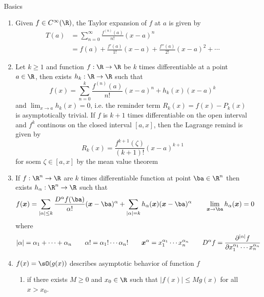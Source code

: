 \documentclass[11pt]{article}
\begin{document}
\tableofcontents

\newpage
\begin{center}
    Basics
\end{center}

\begin{enumerate}
    \item {} Given $f \in C^{\infty}(\R)$, the Taylor expansion of $f$ at $a$ is given by 
    \begin{align*}
        T(a)
        &= \sum_{n=0}^{\infty} \frac{f^{(n)}(a)}{n!} (x-a)^n \\
        &= f(a) + \frac{f'(a)}{1!}(x-a) + \frac{f''(a)}{2!} (x-a)^2 + \cdots
    \end{align*}
    \item {} Let $k\geq 1$ and function $f:\R\to\R$ be $k$ times differentiable at a point $a\in \R$, then exists $h_k:\R\to\R$ such that 
    \[
        f(x)
        = \sum_{n=0}^{k} \frac{f^{(n)}(a)}{n!} (x-a)^n + h_k(x) (x-a)^k
    \]
    and $\lim_{x\to a} h_k(x) = 0$, i.e. the reminder term $R_k(x) = f(x) - P_k(x)$ is asymptotically trivial. If $f$ is $k+1$ times differentiable on the open interval and $f^k$ continous on the closed interval $[a,x]$, then the Lagrange remind is given by 
    \[
        R_k(x) = \frac{f^{k+1}(\zeta)}{(k+1)!} (x-a)^{k+1}
    \]
    for soem $\zeta \in [a,x]$ by the mean value theorem
    \item {} If $f:\R^n\to \R$ are $k$ times differentiable function at point $\ba\in\R^n$ then exists $h_{\alpha}: \R^n \to \R$ such that 
    \[
        f(\bx) = \sum_{|\alpha| \leq k} \frac{D^{\alpha}f(\ba)}{\alpha!}(\bx-\ba)^{\alpha} + \sum_{|\alpha|=k} h_{\alpha}(\bx) (\bx - \ba)^{\alpha}
        \quad \quad \lim_{\bx \to \ba} h_{\alpha}(\bx) = 0
    \]
    where 
    \[
        |\alpha| = \alpha_1 + \cdots + \alpha_n
        \quad \quad 
        \alpha! = \alpha_1!\cdots \alpha_n!
        \quad \quad
        \bm{x}^{\alpha} = x_1^{\alpha_1} \cdots x_n^{\alpha_n}    
        \quad \quad 
        D^{\alpha}f = \frac{\partial^{|\alpha|} f}{\partial x_1^{\alpha_1} \cdots x_n^{\alpha_n}}
    \]
    \item {} $f(x) = \sO(g(x))$   describes asymptotic behavior of function $f$
    \begin{enumerate}
        \item {} if there exists $M\geq 0$ and $x_0\in\R$ such that $|f(x)| \leq M g(x)$ for all $x>x_0$. 

\end{enumerate}
\end{enumerate}
\end{document}
